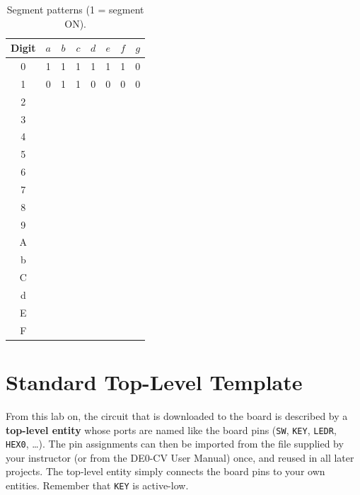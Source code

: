 \documentclass{article}
\begin{document}
\begin{table}[H]
    \centering
    \begin{tabular}{|c|c|c|c|c|c|c|c|}
        \hline
        \textbf{Digit} & $a$ & $b$ & $c$ & $d$ & $e$ & $f$ & $g$ \\
        \hline
        0 & 1 & 1 & 1 & 1 & 1 & 1 & 0 \\ \hline
        1 & 0 & 1 & 1 & 0 & 0 & 0 & 0 \\ \hline
        2 & & & & & & & \\ \hline
        3 & & & & & & & \\ \hline
        4 & & & & & & & \\ \hline
        5 & & & & & & & \\ \hline
        6 & & & & & & & \\ \hline
        7 & & & & & & & \\ \hline
        8 & & & & & & & \\ \hline
        9 & & & & & & & \\ \hline
        A & & & & & & & \\ \hline
        b & & & & & & & \\ \hline
        C & & & & & & & \\ \hline
        d & & & & & & & \\ \hline
        E & & & & & & & \\ \hline
        F & & & & & & & \\ \hline
    \end{tabular}
    \caption{Segment patterns (1 = segment ON).}
    \label{tab:seg}
\end{table}

\section*{Standard Top-Level Template}
From this lab on, the circuit that is downloaded to the board is described by a \textbf{top-level entity} whose ports are named like the board pins (\texttt{SW}, \texttt{KEY}, \texttt{LEDR}, \texttt{HEX0}, \ldots). The pin assignments can then be imported from the file supplied by your instructor (or from the DE0-CV User Manual) once, and reused in all later projects. The top-level entity simply connects the board pins to your own entities. Remember that \texttt{KEY} is active-low.
\end{document}
